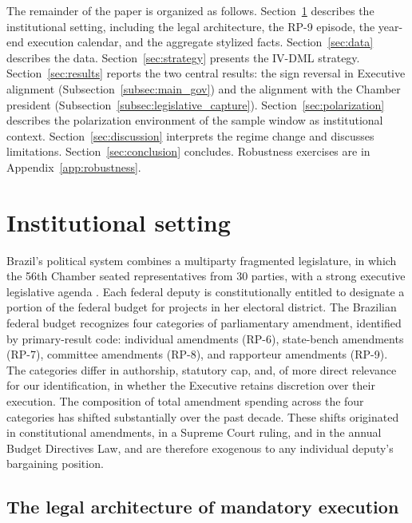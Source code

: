\documentclass[preprint,12pt,authoryear]{elsarticle}
\begin{document}
The remainder of the paper is organized as follows. Section~\ref{sec:institutional} describes the institutional setting, including the legal architecture, the RP-9 episode, the year-end execution calendar, and the aggregate stylized facts. Section~\ref{sec:data} describes the data. Section~\ref{sec:strategy} presents the IV-DML strategy. Section~\ref{sec:results} reports the two central results: the sign reversal in Executive alignment (Subsection~\ref{subsec:main_gov}) and the alignment with the Chamber president (Subsection~\ref{subsec:legislative_capture}). Section~\ref{sec:polarization} describes the polarization environment of the sample window as institutional context. Section~\ref{sec:discussion} interprets the regime change and discusses limitations. Section~\ref{sec:conclusion} concludes. Robustness exercises are in Appendix~\ref{app:robustness}.

\section{Institutional setting}
\label{sec:institutional}

Brazil's political system combines a multiparty fragmented legislature, in which the 56th Chamber seated representatives from 30 parties, with a strong executive legislative agenda \citep{Abranches1988,FigueiredoLimongi2000}. Each federal deputy is constitutionally entitled to designate a portion of the federal budget for projects in her electoral district. The Brazilian federal budget recognizes four categories of parliamentary amendment, identified by primary-result code: individual amendments (RP-6), state-bench amendments (RP-7), committee amendments (RP-8), and rapporteur amendments (RP-9). The categories differ in authorship, statutory cap, and, of more direct relevance for our identification, in whether the Executive retains discretion over their execution. The composition of total amendment spending across the four categories has shifted substantially over the past decade. These shifts originated in constitutional amendments, in a Supreme Court ruling, and in the annual Budget Directives Law, and are therefore exogenous to any individual deputy's bargaining position.

\subsection{The legal architecture of mandatory execution}
\label{subsec:legal_architecture}
\end{document}
